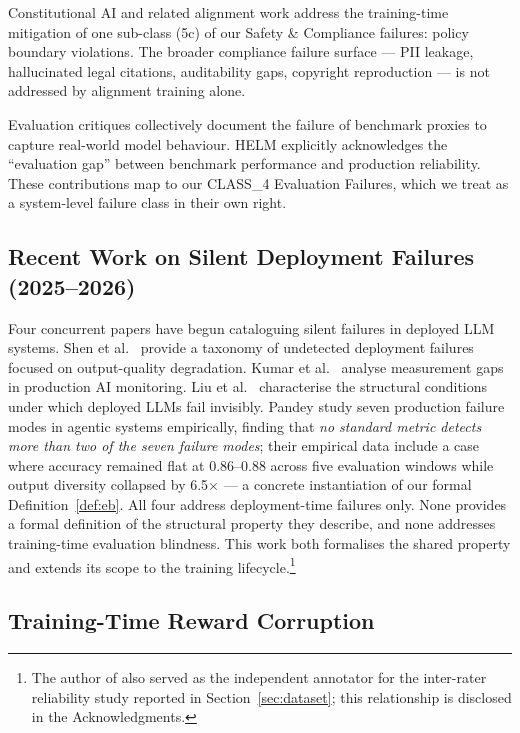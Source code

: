 \documentclass{article}
\begin{document}
Constitutional AI \citep{bai2022constitutional} and related alignment work
address the training-time mitigation of one sub-class (5c) of our Safety \&
Compliance failures: policy boundary violations.  The broader compliance
failure surface --- PII leakage, hallucinated legal citations, auditability
gaps, copyright reproduction --- is not addressed by alignment training alone.

Evaluation critiques \citep{bowman2021nlu, liang2022helm, ribeiro2020checklist,
shankar2020evaluating} collectively document the failure of benchmark proxies
to capture real-world model behaviour.  HELM \citep{liang2022helm} explicitly
acknowledges the ``evaluation gap'' between benchmark performance and production
reliability.  These contributions map to our CLASS\_4 Evaluation Failures,
which we treat as a system-level failure class in their own right.

\subsection{Recent Work on Silent Deployment Failures (2025--2026)}

Four concurrent papers have begun cataloguing silent failures in deployed
LLM systems.  Shen et al.\ \citep{shen2025silent} provide a taxonomy of
undetected deployment failures focused on output-quality degradation.  Kumar
et al.\ \citep{kumar2025deployment} analyse measurement gaps in production AI
monitoring.  Liu et al.\ \citep{liu2025blindspot} characterise the structural
conditions under which deployed LLMs fail invisibly.  Pandey
\citep{pandey2026evaluating} study seven production failure modes in agentic
systems empirically, finding that \emph{no standard metric detects more than
two of the seven failure modes}; their empirical data include a case where
accuracy remained flat at 0.86--0.88 across five evaluation windows while
output diversity collapsed by 6.5$\times$ --- a concrete instantiation of
our formal Definition~\ref{def:eb}.  All four address deployment-time failures
only.  None provides a formal definition of the structural property they
describe, and none addresses training-time evaluation blindness.  This work
both formalises the shared property and extends its scope to the training
lifecycle.\footnote{The author of \citet{pandey2026evaluating} also served as
the independent annotator for the inter-rater reliability study reported in
Section~\ref{sec:dataset}; this relationship is disclosed in the
Acknowledgments.}

\subsection{Training-Time Reward Corruption}
\end{document}

